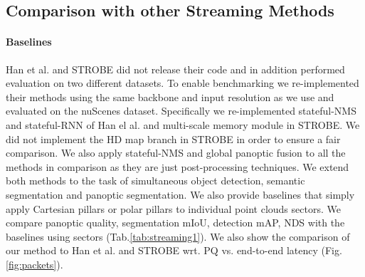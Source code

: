 \documentclass{article}
\begin{document}
\subsection{Comparison with other Streaming Methods}

\paragraph{Baselines}
Han et al.\cite{han2020streaming} and STROBE\cite{frossard2020strobe} did not release their code and in addition performed evaluation on two different datasets. To enable benchmarking we re-implemented their methods using the same backbone and input resolution as we use and evaluated on the nuScenes dataset. Specifically we re-implemented stateful-NMS and stateful-RNN of Han el al. and multi-scale memory module in STROBE. We did not implement the HD map branch in STROBE in order to ensure a fair comparison. We also apply stateful-NMS and global panoptic fusion to all the methods in comparison as they are just post-processing techniques. We extend both methods to the task of simultaneous object detection, semantic segmentation and panoptic segmentation. We also provide baselines that simply apply Cartesian pillars or polar pillars to individual point clouds sectors. We compare panoptic quality, segmentation mIoU, detection mAP, NDS with the baselines using  sectors (Tab.\ref{tab:streaming1}). We also show the comparison of our method to Han et al. and STROBE wrt. PQ vs. end-to-end latency (Fig. \ref{fig:packets}).
\end{document}

